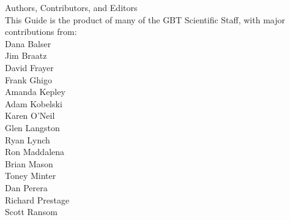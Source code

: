 \documentclass{book}
\begin{document}

\vspace*{2in}

\begin{center}
{{\bigskip \LARGE Authors, Contributors, and Editors\\ \bigskip} 
\large This Guide is the product of many of the GBT Scientific Staff, with major contributions from:\\
\bigskip
\large Dana Balser\\ \bigskip
\large Jim Braatz\\ \bigskip
\large David Frayer\\ \bigskip
\large Frank Ghigo\\ \bigskip
\large Amanda Kepley \\ \bigskip
\large Adam Kobelski\\ \bigskip
\large Karen O'Neil \\ \bigskip
\large Glen Langston \\ \bigskip 
\large Ryan Lynch \\ \bigskip
\large Ron Maddalena\\ \bigskip
\large Brian Mason\\ \bigskip 
\large Toney Minter\\ \bigskip
\large Dan Perera\\ \bigskip
\large Richard Prestage\\ \bigskip
\large Scott Ransom\\ \bigskip  } 
\end{center}

{}
\setcounter{page}{-12}
\pagestyle{plain}

\setcounter{secnumdepth}{4}
\setcounter{tocdepth}{4}
\tableofcontents

\listoffigures
\listoftables
\lstlistoflistings

\newpage
\mainmatter
{}
\pagestyle{headings}


\end{document}
